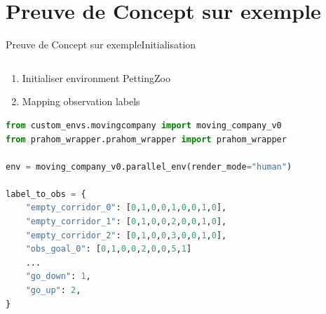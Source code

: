 

\section{Preuve de Concept sur exemple}

\begin{frame}[fragile]{Preuve de Concept sur exemple}{Initialisation}

    \begin{columns}

        \begin{column}{0.6\textwidth}

            \begin{enumerate}
                \item Initialiser environment PettingZoo
                \item Mapping observation labels
            \end{enumerate}
    
\begin{lstlisting}[language=Python,basicstyle=\scriptsize]
from custom_envs.movingcompany import moving_company_v0
from prahom_wrapper.prahom_wrapper import prahom_wrapper

env = moving_company_v0.parallel_env(render_mode="human")

label_to_obs = {
    "empty_corridor_0": [0,1,0,0,1,0,0,1,0],
    "empty_corridor_1": [0,1,0,0,2,0,0,1,0],
    "empty_corridor_2": [0,1,0,0,3,0,0,1,0],
    "obs_goal_0": [0,1,0,0,2,0,0,5,1]
    ...
    "go_down": 1,
    "go_up": 2,
}
\end{lstlisting}
    
        \end{column}
    

\end{columns}
\end{frame}
